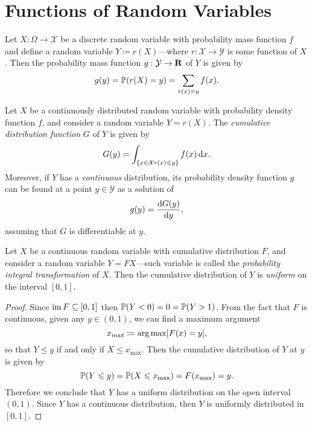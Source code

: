 \section{Functions of Random Variables}

\begin{proposition}
    \label{prop:fn-of-rand-var-discrete-case}
    Let \(X: \Omega \to \mathcal{X}\) be a discrete random variable with probability
    mass function \(f\) and define a random variable \(Y \coloneq r(X)\)---where
    \(r: \mathcal{X} \to \mathcal{Y}\) is some function of \(X\). Then the
    probability mass function \(g: \mathcal{Y} \to \mathbf{R}\) of \(Y\) is given by
    \[
        g(y) = \operatorname{\mathbb{P}}(r(X) = y) = \sum_{r(x) = y} f(x).
    \]
\end{proposition}

\begin{proposition}
    \label{prop:fn-of-rand-var-continuous-case}
    Let \(X\) be a continuously distributed random variable with probability density
    function \(f\), and consider a random variable \(Y = r(X)\). The
    \emph{cumulative distribution function} \(G\) of \(Y\) is given by
    \[
        G(y) = \int_{\{x \in \mathcal{X} \relax r(x) \leqslant y\}} f(x)\, \mathrm{d} x.
    \]
    Moreover, if \(Y\) has a \emph{continuous} distribution, its probability
    density function \(g\) can be found at a point \(y \in \mathcal{Y}\) as a solution of
    \[
        g(y) = \frac{\mathrm{d} G(y)}{\mathrm{d} y},
    \]
    assuming that \(G\) is differentiable at \(y\).
\end{proposition}

\begin{proposition}
    \label{prop:probability-integral-transformation}
    Let \(X\) be a continuous random variable with cumulative distribution \(F\),
    and consider a random variable \(Y = F X\)---such variable is called the
    \emph{probability integral transformation} of \(X\). Then the cumulative
    distribution of \(Y\) is \emph{uniform} on the interval \([0, 1]\).
\end{proposition}

\begin{proof}
    Since \(\operatorname{im} F \subseteq [0, 1]\) then \(\operatorname{\mathbb{P}}(Y < 0) = 0 = \operatorname{\mathbb{P}}(Y > 1)\). From
    the fact that \(F\) is continuous, given any \(y \in (0, 1)\), we can find a
    maximum argument
    \[
        x_{\text{max}} \coloneq \operatorname*{arg\,max} [F(x) = y],
    \]
    so that \(Y \leq y\) if and only if \(X \leq x_{\text{max}}\). Then the
    cumulative distribution of \(Y\) at \(y\) is given by
    \[
        \operatorname{\mathbb{P}}(Y \leqslant y) = \operatorname{\mathbb{P}}(X \leqslant x_{\text{max}}) = F(x_{\text{max}}) = y.
    \]
    Therefore we conclude that \(Y\) has a uniform distribution on the open interval
    \((0, 1)\). Since \(Y\) has a continuous distribution, then \(Y\) is uniformly
    distributed in \([0, 1]\).
\end{proof}

